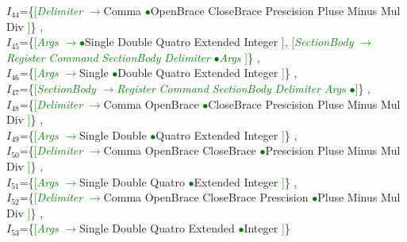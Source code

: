 \documentclass[a0]{a0poster}
\begin{document}
$I_{44}$=\{\textcolor{Green}{[}\textcolor{Green}{\textit{Delimiter}} \textcolor{Green}{$\to$}Comma \textcolor{Green}{$\bullet$}OpenBrace CloseBrace Prescision Pluse Minus Mul Div \textcolor{Green}{]}\}
,\\
$I_{45}$=\{\textcolor{Green}{[}\textcolor{Green}{\textit{Args}} \textcolor{Green}{$\to$}\textcolor{Green}{$\bullet$}Single Double Quatro Extended Integer \textcolor{Green}{]}, \textcolor{Green}{[}\textcolor{Green}{\textit{SectionBody}} \textcolor{Green}{$\to$}\textcolor{Green}{\textit{Register}} \textcolor{Green}{\textit{Command}} \textcolor{Green}{\textit{SectionBody}} \textcolor{Green}{\textit{Delimiter}} \textcolor{Green}{$\bullet$}\textcolor{Green}{\textit{Args}} \textcolor{Green}{]}\}
,\\
$I_{46}$=\{\textcolor{Green}{[}\textcolor{Green}{\textit{Args}} \textcolor{Green}{$\to$}Single \textcolor{Green}{$\bullet$}Double Quatro Extended Integer \textcolor{Green}{]}\}
,\\
$I_{47}$=\{\textcolor{Green}{[}\textcolor{Green}{\textit{SectionBody}} \textcolor{Green}{$\to$}\textcolor{Green}{\textit{Register}} \textcolor{Green}{\textit{Command}} \textcolor{Green}{\textit{SectionBody}} \textcolor{Green}{\textit{Delimiter}} \textcolor{Green}{\textit{Args}} \textcolor{Green}{$\bullet$}\textcolor{Green}{]}\}
,\\
$I_{48}$=\{\textcolor{Green}{[}\textcolor{Green}{\textit{Delimiter}} \textcolor{Green}{$\to$}Comma OpenBrace \textcolor{Green}{$\bullet$}CloseBrace Prescision Pluse Minus Mul Div \textcolor{Green}{]}\}
,\\
$I_{49}$=\{\textcolor{Green}{[}\textcolor{Green}{\textit{Args}} \textcolor{Green}{$\to$}Single Double \textcolor{Green}{$\bullet$}Quatro Extended Integer \textcolor{Green}{]}\}
,\\
$I_{50}$=\{\textcolor{Green}{[}\textcolor{Green}{\textit{Delimiter}} \textcolor{Green}{$\to$}Comma OpenBrace CloseBrace \textcolor{Green}{$\bullet$}Prescision Pluse Minus Mul Div \textcolor{Green}{]}\}
,\\
$I_{51}$=\{\textcolor{Green}{[}\textcolor{Green}{\textit{Args}} \textcolor{Green}{$\to$}Single Double Quatro \textcolor{Green}{$\bullet$}Extended Integer \textcolor{Green}{]}\}
,\\
$I_{52}$=\{\textcolor{Green}{[}\textcolor{Green}{\textit{Delimiter}} \textcolor{Green}{$\to$}Comma OpenBrace CloseBrace Prescision \textcolor{Green}{$\bullet$}Pluse Minus Mul Div \textcolor{Green}{]}\}
,\\
$I_{53}$=\{\textcolor{Green}{[}\textcolor{Green}{\textit{Args}} \textcolor{Green}{$\to$}Single Double Quatro Extended \textcolor{Green}{$\bullet$}Integer \textcolor{Green}{]}\}
\end{document}

